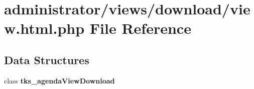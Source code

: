 \section{administrator/views/download/view.html.\+php File Reference}
\label{administrator_2views_2download_2view_8html_8php}
\subsection*{Data Structures}
\begin{DoxyCompactItemize}
\item 
class \textbf{ tks\+\_\+agenda\+View\+Download}
\end{DoxyCompactItemize}
